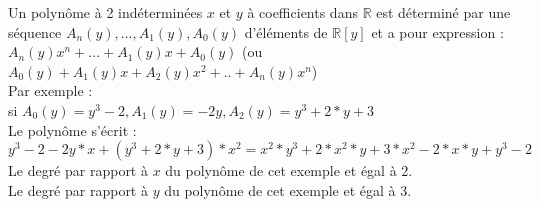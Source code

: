 \documentclass[12pt,a4paper]{book}
\begin{document}
\begin{giacjshere}
Un polyn\^ome \`a 2 ind\'etermin\'ees $x$ et $y$ \`a coefficients dans $\mathbb{R}$ est d\'etermin\'e par 
une s\'equence $A_n(y),...,A_1(y),A_0(y)$ d'\'el\'ements de $\mathbb{R}[y]$
et a pour expression :\\ 
$A_n(y)x^n+...+A_1(y)x+A_0(y)$ (ou $A_0(y)+A_1(y)x+A_2(y)x^2+..+A_n(y)x^n$)\\
Par exemple :\\
si $A_0(y)=y^3-2,A_1(y)=-2y,A_2(y)=y^3+2*y+3$\\
Le polyn\^ome s'\'ecrit :\\
$y^3-2-2y*x+(y^3+2*y+3)*x^2=x^2*y^3+2*x^2*y+3*x^2-2*x*y+y^3-2$\\
Le degr\'e par rapport \`a $x$ du polyn\^ome de cet exemple et \'egal \`a 2.\\
Le degr\'e par rapport \`a $y$ du polyn\^ome de cet exemple et \'egal \`a 3.


\end{giacjshere}
\end{document}
